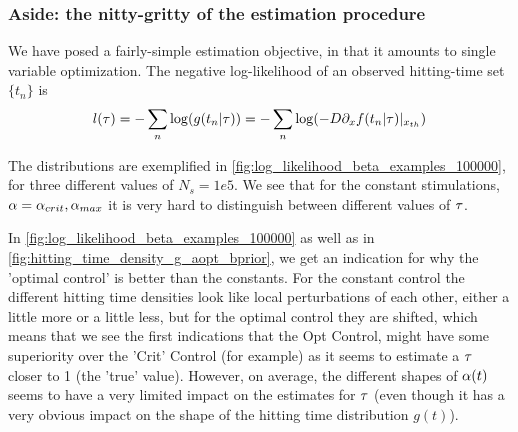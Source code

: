 \documentclass{article}
\begin{document}
\subsubsection{Aside: the nitty-gritty of the estimation procedure}
We have posed a fairly-simple estimation objective, in that it amounts to single
variable optimization. The negative log-likelihood of an observed hitting-time
set $\{t_n\}$ is
\begin{equation}
l({ \tau }) = - \sum_n \log ( g(t_n | { \tau }) ) =  - \sum_n \log ( -D {\partial}_x f(t_n |
{ \tau }) |_{{ x_{th} }} )
\end{equation}

The distributions are exemplified in
\cref{fig:log_likelihood_beta_examples_100000},
for three different values of $N_s =  1e5$. We see that for the constant
stimulations, ${\alpha} = {\alpha}_{crit}, {\alpha}_{max}$ it is very hard to
distinguish between different values of ${ \tau }$. 

In \cref{fig:log_likelihood_beta_examples_100000} as well as in 
\cref{fig:hitting_time_density_g_aopt_bprior}, we get an indication for why
the 'optimal control' is better than the constants. For the constant control
the different hitting time densities look like local perturbations of each
other, either a little more or a little less, but for the optimal control they
are shifted, which means that we see the first indications that the Opt Control,
might have some superiority over the 'Crit' Control (for example) as it seems to estimate a ${ \tau }$ closer to 1 (the 'true' value). However, on average, the different shapes of ${\alpha}(t)$ seems to have a very limited impact on the estimates for ${ \tau }$ (even though it has a very obvious impact on the shape of the hitting time distribution $g(t)$).
\end{document}
